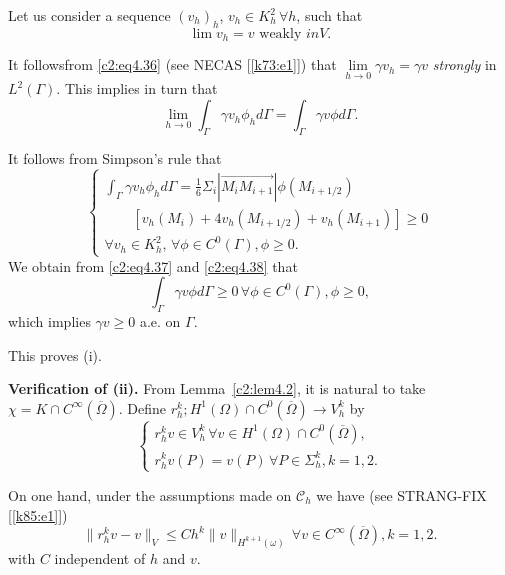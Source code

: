 Let us consider a sequence $(v_h)_h$, $v_h \in K^2_h\, \forall  h$,
such that  
\begin{equation}
\lim v_h = v \text{ weakly } in V . \tag{4.36}\label{c2:eq4.36}
\end{equation}

It follows\pageoriginale  from \eqref{c2:eq4.36} (see NECAS
[\ref{k73:e1}]) that $\displaystyle{\lim\limits_{h\to 0} 
\gamma v_h = \gamma v}$ \textit{ strongly } in $L^2 (\Gamma)$. This
implies in turn that  
\begin{equation}
\lim_{h \to 0} \int_\Gamma \gamma v_h \phi_h  d \Gamma = \int_\Gamma
\gamma v \phi d \Gamma. \tag{4.37}\label{c2:eq4.37} 
\end{equation}

It follows from Simpson's rule that 
\begin{equation}
\begin{cases}
\int_\Gamma \gamma v_h \phi_h d \Gamma 
= \frac{1}{6} \Sigma_i
|\overrightarrow{M_i M_{i+1}}| \phi (M_{i+1/2})\\
\qquad [v_h (M_i) + 4v_h
  (M_{i+1/2}) + v_h (M_{i+1}) ]\geq 0\\ 
\forall v_h \in K^2_h,\, \forall  \phi \in C^0 (\Gamma) , \phi
\geq 0.\tag{4.38}\label{c2:eq4.38} 
\end{cases}
\end{equation}
We  obtain from \eqref{c2:eq4.37} and \eqref{c2:eq4.38} that 
$$
\int_\Gamma  \gamma v \phi d \Gamma \geq 0\, \forall  \phi \in C^0
(\Gamma) , \phi \geq 0, 
$$
which implies $\gamma v \geq 0$ a.e.  on $\Gamma$. 

This proves (i).

\noindent \textbf{Verification of (ii).}
From Lemma~\ref{c2:lem4.2}, it is natural to take $\chi = K \cap
C^\infty (\overline{\Omega})$. 
  Define $r^k_h ; H^1 (\Omega) \cap C^0 (\overline{\Omega}) \to V^k_h$ by 
 \begin{equation}
 \begin{cases}
r^k_h v \in  V^k_h\, \forall  v \in H^1 (\Omega) \cap C^0
(\overline{\Omega}) ,\\ 
r^k_h v(P) = v(P)\, \forall  P \in \Sigma^k_h, k=1,
2.\tag{4.39}\label{c2:eq4.39} 
 \end{cases} 
 \end{equation} 

 
On one hand, under the assumptions made on $\mathscr{C}_h$ we have
(see STRANG-FIX [\ref{k85:e1}])  
 \begin{equation}
\parallel r^k_h v-v\parallel_V \leq Ch^k \parallel v\parallel_{H^{k+1}(\omega)}\, \forall  v \in
C^\infty (\overline{\Omega}), k=1, 2.\tag{4.40}\label{c2:eq4.40} 
 \end{equation} 
 with $C$ independent of $h$ and $v$.
 
